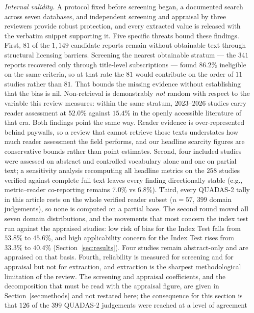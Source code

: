 \documentclass[review,authoryear]{elsarticle}
\begin{document}
\emph{Internal validity.} A protocol fixed before screening began, a documented search
across seven databases, and independent screening and appraisal by three reviewers provide
robust protection, and every extracted value is released with the verbatim snippet supporting
it. Five specific threats bound these findings.
First, $81$ of the $1{,}149$ candidate reports remain without obtainable text through
structural licensing barriers. Screening the nearest obtainable stratum --- the $341$
reports recovered only through title-level subscriptions --- found $86.2\%$ ineligible on
the same criteria, so at that rate the $81$ would contribute on the order of $11$ studies
rather than $81$. That bounds the missing evidence without establishing that the bias is
nil. Non-retrieval is demonstrably \emph{not} random with respect to the variable this
review measures: within the same stratum, 2023--2026 studies carry reader assessment at
$52.0\%$ against $15.4\%$ in the openly accessible literature of that era. Both findings
point the same way. Reader evidence is over-represented behind paywalls, so a review that
cannot retrieve those texts understates how much reader assessment the field performs, and
our headline scarcity figures are conservative bounds rather than point estimates.
Second, four included studies were assessed on abstract and controlled vocabulary alone and one on partial text; a sensitivity analysis recomputing all headline metrics on the $258$ studies verified against complete full text leaves every finding directionally stable (e.g., metric--reader co-reporting remains $7.0\%$ vs $6.8\%$).
Third, every QUADAS-2 tally in this article rests on the whole verified reader subset ($n=57$, $399$ domain judgements), so none is computed on a partial base. The second round moved all seven domain distributions, and the movements that most concern the index test run against the appraised studies: low risk of bias for the Index Test falls from $53.8\%$ to $45.6\%$, and high applicability concern for the Index Test rises from $33.3\%$ to $40.4\%$ (Section~\ref{sec:results}). Four studies remain abstract-only and are appraised on that basis.
Fourth, reliability is measured for screening and for appraisal but not for extraction,
and extraction is the sharpest methodological limitation of the review. The screening and
appraisal coefficients, and the decomposition that must be read with the appraisal figure,
are given in Section~\ref{sec:methods} and not restated here; the consequence for this
section is that $126$ of the $399$ QUADAS-2 judgements were reached at a level of agreement
\end{document}
